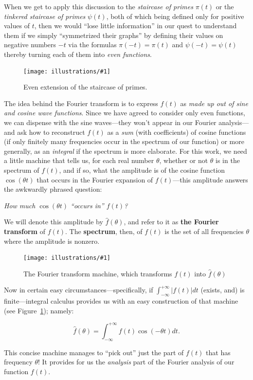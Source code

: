 \documentclass[openany]{book}
\newcommand{\ill}[3]{%
   \begin{figure}[H]%
   \vspace{-2ex}
   \centering%
   \texttt{[image: illustrations/\#1]}%
   \caption{#3}%
   \vspace{-2ex}
    \end{figure}}
\theoremstyle{plain}
\theoremstyle{definition}
\begin{document}
{  When we get to apply this discussion to the {\it staircase of
    primes} $\pi(t)$ or the {\it tinkered staircase of primes}
  $\psi(t)$, both of which being defined only for positive values of
  $t$, then we would ``lose little information'' in our quest to
  understand them if we simply ``symmetrized their graphs'' by
  defining their values on negative numbers $-t$ via the formulas
  $\pi(-t)=\pi(t)$ and $\psi(-t)=\psi(t)$ thereby turning each of them
  into {\it even functions}.

\ill{even_pi}{.8}{Even extension of the staircase of primes.}

The idea behind the Fourier transform is to express $f(t)$ as {\it
  made up out of sine and cosine wave functions}.  Since we have
agreed to consider only even functions, we can dispense with the sine
waves---they won't appear in our Fourier analysis---and ask how to
reconstruct $f(t)$ as a {\it sum} (with coefficients) of cosine
functions (if only finitely many frequencies occur in the spectrum of
our function) or more generally, as an {\it integral} if the spectrum
is more elaborate.  For this work, we need a little machine that tells
us, for each real number $\theta$, whether or not $\theta$ is in the
spectrum of $f(t)$, and if so, what the amplitude is of the cosine
function $\cos(\theta t)$ that occurs in the Fourier expansion of
$f(t)$---this amplitude answers the awkwardly phrased question:

{\it
  How much $\cos(\theta t)$ ``occurs in'' $f(t)$?}

  We will denote this
amplitude by ${\hat f}(\theta)$, and refer to it as {\bf the Fourier
  transform} of $f(t)$.  The {\bf spectrum}, then, of $f(t)$ is the
set of all frequencies $\theta$ where the amplitude is nonzero.

\ill{fourier_machine}{.6}{The Fourier transform machine, which transforms $f(t)$ into ${\hat f}(\theta)$\label{fig:fourier_machine}}


Now in certain easy circumstances---specifically, if
$\int_{-{\infty}}^{+{\infty}}|f(t)|dt$ (exists, and)
is finite---integral calculus provides us with an easy construction of that
machine (see Figure~\ref{fig:fourier_machine}); namely:

    $${\hat f}(\theta) = \int_{-{\infty}}^{+{\infty}}f(t)\cos(-\theta t)dt.$$


    This concise machine manages to ``pick out'' just the part of
    $f(t)$ that has frequency $\theta$!  It provides for us the {\it
      analysis} part of the Fourier analysis of our function
    $f(t)$.

}
\end{document}
